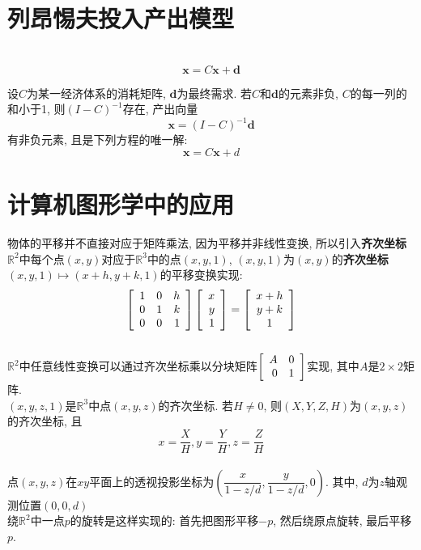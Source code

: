 \section{列昂惕夫投入产出模型}
\begin{law}[列昂惕夫投入产出模型或生产方程]\ \\
\[\bm{x}=C\bm{x}+\bm{d}\]
\end{law}\vspace{4ex}

\begin{TheoremOne}
设$C$为某一经济体系的消耗矩阵, $\bm{d}$为最终需求. 若$C$和$\bm{d}$的元素非负, $C$的每一列的和小于1, 则$(I-C)^{-1}$存在, 产出向量
\[\bm{x}=(I-C)^{-1}\bm{d}\]
有非负元素, 且是下列方程的唯一解:
\[\bm{x}=C\bm{x}+d\]
\end{TheoremOne}\vspace{8ex}

\section{计算机图形学中的应用}
物体的平移并不直接对应于矩阵乘法, 因为平移并非线性变换, 所以引入\textbf{齐次坐标}\\[1ex]
$\mathbb{R}^2$中每个点$(x,y)$对应于$\mathbb{R}^3$中的点$(x,y,1)$, $(x,y,1)$为$(x,y)$的\textbf{齐次坐标}\\[1ex]
$(x,y,1)\mapsto(x+h,y+k,1)$的平移变换实现:\\
\[\left[\begin{array}{r r r}
1 & 0 & h\\
0 & 1 & k\\
0 & 0 & 1
\end{array}\right]
\left[\begin{array}{r}
x\\
y\\
1
\end{array}\right]=
\left[\begin{array}{c}
x+h\\
y+k\\
1
\end{array}\right]\]\\[2ex]
$\mathbb{R}^2$中任意线性变换可以通过齐次坐标乘以分块矩阵$\left[\begin{array}{r r}A & 0\\0 & 1\end{array}\right]$实现, 其中$A$是$2\times 2$矩阵.\\[2ex]
$(x,y,z,1)$是$\mathbb{R}^3$中点$(x,y,z)$的齐次坐标. 若$H\neq 0$, 则$(X,Y,Z,H)$为$(x,y,z)$的齐次坐标, 且
\[x=\frac{X}{H},y=\frac{Y}{H},z=\frac{Z}{H}\]\\[1ex]
点$(x,y,z)$在$xy$平面上的透视投影坐标为$(\dfrac{x}{1-z/d}, \dfrac{y}{1-z/d}, 0)$. 其中, $d$为$z$轴观测位置$(0,0,d)$\\[2ex]
绕$\mathbb{R}^2$中一点$p$的旋转是这样实现的: 首先把图形平移$-p$, 然后绕原点旋转, 最后平移$p$.
